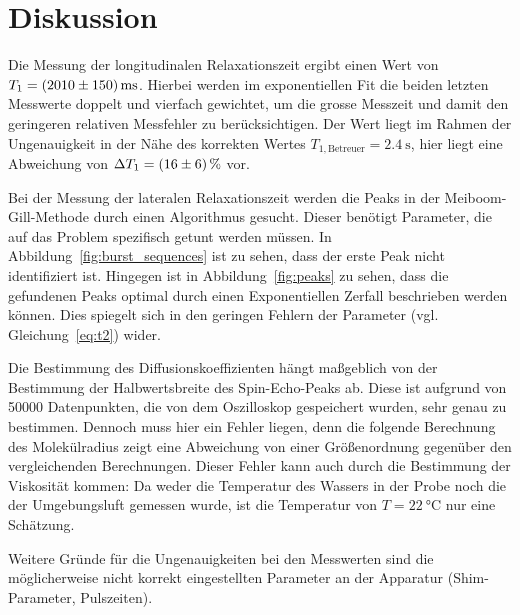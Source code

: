 \section{Diskussion}%
\label{sec:diskussion}
Die Messung der longitudinalen Relaxationszeit
ergibt einen Wert von $T_1 = \SI{2010 \pm 150}{\milli\second}$.
Hierbei werden im exponentiellen Fit die beiden letzten Messwerte doppelt und vierfach gewichtet,
um die grosse Messzeit und damit den geringeren relativen Messfehler zu berücksichtigen.
Der Wert liegt im Rahmen der Ungenauigkeit in der Nähe des korrekten Wertes
$T_{1, \text{Betreuer}} = \SI{2.4}{\second}$\cite{t1betreuer},
hier liegt eine Abweichung von $\Delta T_1 = \SI{16\pm6}{\percent}$ vor.

Bei der Messung der lateralen Relaxationszeit werden die Peaks in der Meiboom-Gill-Methode
durch einen Algorithmus gesucht.
Dieser benötigt Parameter, die auf das Problem spezifisch getunt werden müssen.
In Abbildung~\ref{fig:burst_sequences} ist zu sehen, dass der erste Peak nicht identifiziert ist.
Hingegen ist in Abbildung~\ref{fig:peaks} zu sehen, dass die gefundenen Peaks
optimal durch einen Exponentiellen Zerfall beschrieben werden können.
Dies spiegelt sich in den geringen Fehlern der Parameter (vgl. Gleichung~\eqref{eq:t2}) wider.

Die Bestimmung des Diffusionskoeffizienten hängt maßgeblich von der Bestimmung der Halbwertsbreite des
Spin-Echo-Peaks ab.
Diese ist aufgrund von \num{50000} Datenpunkten, die von dem Oszilloskop gespeichert wurden, sehr genau zu bestimmen.
Dennoch muss hier ein Fehler liegen, denn die folgende Berechnung des Molekülradius
zeigt eine Abweichung von einer Größenordnung gegenüber den vergleichenden Berechnungen.
Dieser Fehler kann auch durch die Bestimmung der Viskosität kommen:
Da weder die Temperatur des Wassers in der Probe noch die der Umgebungsluft gemessen wurde,
ist die Temperatur von $T = \SI{22}{\celsius}$ nur eine Schätzung.

Weitere Gründe für die Ungenauigkeiten bei den Messwerten sind die
möglicherweise nicht korrekt eingestellten Parameter an der Apparatur
(Shim-Parameter, Pulszeiten).
